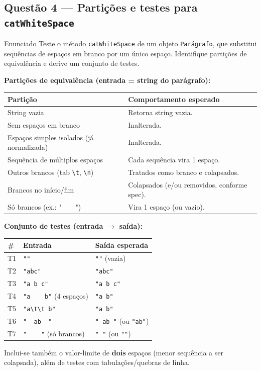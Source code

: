 \documentclass[11pt,a4paper]{article}
\begin{document}
\subsection*{Questão 4 — Partições e testes para \texttt{catWhiteSpace}}
\begin{questao}{Enunciado}
Teste o método \texttt{catWhiteSpace} de um objeto \texttt{Parágrafo}, que
substitui sequências de espaços em branco por um único espaço. Identifique
partições de equivalência e derive um conjunto de testes.
\end{questao}
\begin{resposta}
\textbf{Partições de equivalência (entrada = string do parágrafo):}
\begin{center}\small
\begin{tabular}{@{}p{6.6cm}p{7.8cm}@{}}
\toprule
\textbf{Partição} & \textbf{Comportamento esperado} \\
\midrule
String vazia & Retorna string vazia. \\
Sem espaços em branco & Inalterada. \\
Espaços simples isolados (já normalizada) & Inalterada. \\
Sequência de múltiplos espaços & Cada sequência vira 1 espaço. \\
Outros brancos (tab \texttt{\textbackslash t}, \texttt{\textbackslash n}) & Tratados como branco e colapsados. \\
Brancos no início/fim & Colapsados (e/ou removidos, conforme spec). \\
Só brancos (ex.: "\ \ \ \ ") & Vira 1 espaço (ou vazio). \\
\bottomrule
\end{tabular}
\end{center}

\textbf{Conjunto de testes (entrada $\to$ saída):}
\begin{center}\small
\begin{tabular}{@{}llp{6.2cm}@{}}
\toprule
\textbf{\#} & \textbf{Entrada} & \textbf{Saída esperada} \\
\midrule
T1 & \texttt{""} & \texttt{""} (vazia) \\
T2 & \texttt{"abc"} & \texttt{"abc"} \\
T3 & \texttt{"a b c"} & \texttt{"a b c"} \\
T4 & \texttt{"a\ \ \ \ b"} (4 espaços) & \texttt{"a b"} \\
T5 & \texttt{"a\textbackslash t\textbackslash t b"} & \texttt{"a b"} \\
T6 & \texttt{"\ \ ab\ \ "} & \texttt{" ab "} (ou \texttt{"ab"}) \\
T7 & \texttt{"\ \ \ \ "} (só brancos) & \texttt{" "} (ou \texttt{""}) \\
\bottomrule
\end{tabular}
\end{center}
Inclui-se também o valor-limite de \textbf{dois} espaços (menor sequência a ser
colapsada), além de testes com tabulações/quebras de linha.
\end{resposta}
\end{document}
